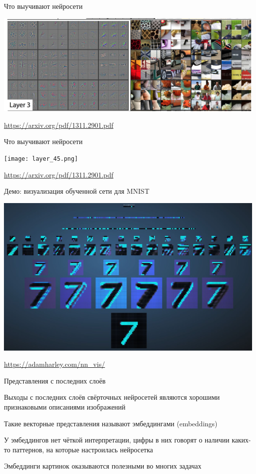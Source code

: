 \documentclass[notes,12pt, aspectratio=169]{beamer}
\newenvironment{wideitemize}{\itemize\addtolength{\itemsep}{10pt}}{\enditemize}
\begin{document}
\begin{frame}{Что выучивают нейросети}
\begin{center}
	\includegraphics[width=0.73\paperwidth]{layer_2.png}
\end{center}
\vfill
\footnotesize
{\color{blue} \url{https://arxiv.org/pdf/1311.2901.pdf}}
\end{frame}


\begin{frame}{Что выучивают нейросети}
\begin{center}
	\texttt{[image: layer\_45.png]}
\end{center}
\vfill
\footnotesize
{\color{blue} \url{https://arxiv.org/pdf/1311.2901.pdf}}
\end{frame}


\begin{frame}{Демо: визуализация обученной сети для MNIST}
\begin{center}
	\includegraphics[width=0.7\paperwidth]{mnist_demo.png}
\end{center}
\vfill
\footnotesize
{\color{blue} \url{https://adamharley.com/nn_vis/}}
\end{frame}


\begin{frame}{Представления с последних слоёв}
\begin{wideitemize}
	\item  Выходы с последних слоёв свёрточных нейросетей являются хорошими признаковыми описаниями изображений
	\item Такие векторные представления называют \alert{эмбеддингами (embeddings)}
	\item У эмбеддингов нет чёткой интерпретации, цифры в них говорят о наличии каких-то паттернов, на которые настроилась нейросетка
	\item Эмбеддинги картинок оказываются полезными во многих задачах 
\end{wideitemize}
\end{frame}
\end{document}
